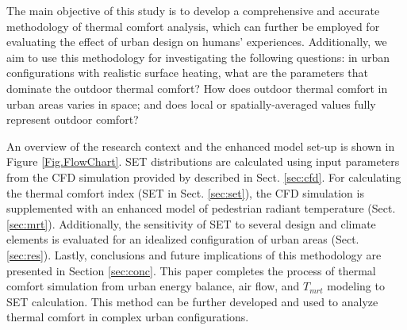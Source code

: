 \documentclass[smallextended]{svjour3}
\begin{document}
The main objective of this study is to develop a comprehensive and accurate methodology of thermal comfort analysis, which can further be employed for evaluating the effect of urban design on humans' experiences.  Additionally, we aim to use this methodology for investigating the following questions: in urban configurations with realistic surface heating, what are the parameters that dominate the outdoor thermal comfort?  How does outdoor thermal comfort in urban areas varies in space; and does local or spatially-averaged values fully represent outdoor comfort? 
 
An overview of the research context and the enhanced model set-up is shown in Figure \ref{Fig.FlowChart}. SET distributions are calculated using input parameters from the CFD simulation provided by \citet{nazarian2014effects, nazarian2015cfd} described in Sect. \ref{sec:cfd}. For calculating the thermal comfort index (SET in Sect. \ref{sec:set}), the CFD simulation is supplemented with an enhanced model of pedestrian radiant temperature (Sect. \ref{sec:mrt}). Additionally, the sensitivity of SET to several design and climate elements is evaluated for an idealized configuration of urban areas (Sect. \ref{sec:res}). Lastly, conclusions and future implications of this methodology are presented in Section \ref{sec:conc}. This paper completes the process of thermal comfort simulation from urban energy balance, air flow, and $T_{mrt}$ modeling to SET calculation. This method can be further developed and used to analyze thermal comfort in complex urban configurations.


{}%
%
%
\end{document}
